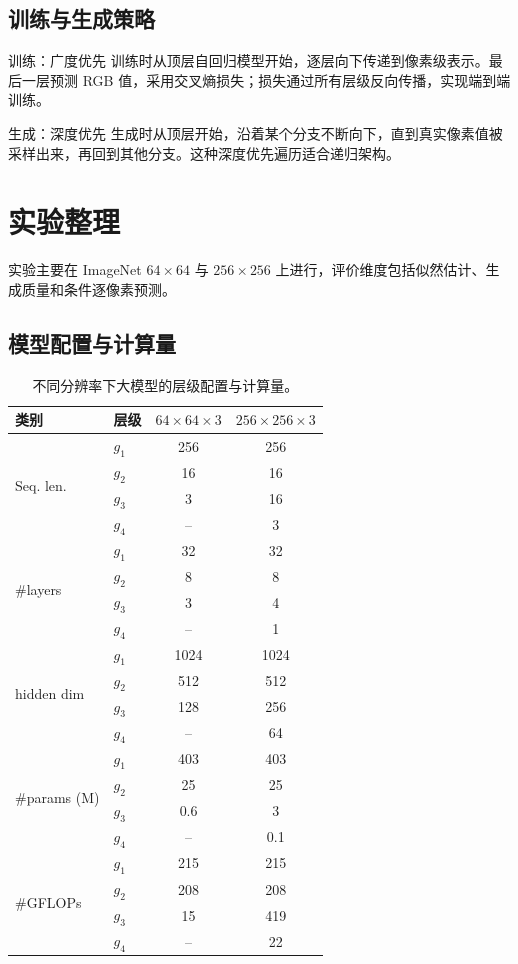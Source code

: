 \documentclass[UTF8,11pt,a4paper]{ctexart}
\begin{document}
\subsection{训练与生成策略}

\begin{keybox}{训练：广度优先}
训练时从顶层自回归模型开始，逐层向下传递到像素级表示。最后一层预测 RGB 值，采用交叉熵损失；损失通过所有层级反向传播，实现端到端训练。
\end{keybox}

\begin{keybox}{生成：深度优先}
生成时从顶层开始，沿着某个分支不断向下，直到真实像素值被采样出来，再回到其他分支。这种深度优先遍历适合递归架构。
\end{keybox}

\section{实验整理}\label{sec:exp}

实验主要在 ImageNet $64\times64$ 与 $256\times256$ 上进行，评价维度包括似然估计、生成质量和条件逐像素预测。

\subsection{模型配置与计算量}

\begin{table}[H]
\centering
\small
\caption{不同分辨率下大模型的层级配置与计算量。}
\begin{tabular}{llcc}
\toprule
类别 & 层级 & $64\times64\times3$ & $256\times256\times3$\\
\midrule
\multirow{4}{*}{Seq. len.} & $g_1$ & 256 & 256\\
 & $g_2$ & 16 & 16\\
 & $g_3$ & 3 & 16\\
 & $g_4$ & -- & 3\\
\midrule
\multirow{4}{*}{\#layers} & $g_1$ & 32 & 32\\
 & $g_2$ & 8 & 8\\
 & $g_3$ & 3 & 4\\
 & $g_4$ & -- & 1\\
\midrule
\multirow{4}{*}{hidden dim} & $g_1$ & 1024 & 1024\\
 & $g_2$ & 512 & 512\\
 & $g_3$ & 128 & 256\\
 & $g_4$ & -- & 64\\
\midrule
\multirow{4}{*}{\#params (M)} & $g_1$ & 403 & 403\\
 & $g_2$ & 25 & 25\\
 & $g_3$ & 0.6 & 3\\
 & $g_4$ & -- & 0.1\\
\midrule
\multirow{4}{*}{\#GFLOPs} & $g_1$ & 215 & 215\\
 & $g_2$ & 208 & 208\\
 & $g_3$ & 15 & 419\\
 & $g_4$ & -- & 22\\
\bottomrule
\end{tabular}
\end{table}
\end{document}
